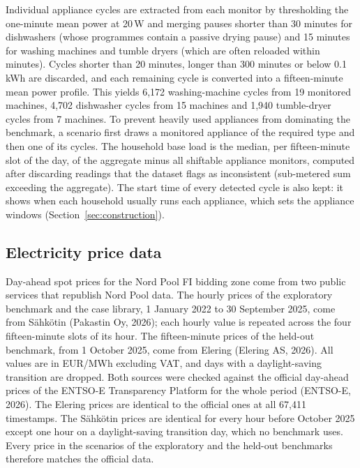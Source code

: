 \documentclass[12pt,a4paper]{report}
\begin{document}
Individual appliance cycles are extracted from each monitor by
thresholding the one-minute mean power at 20\,W and merging pauses
shorter than 30 minutes for dishwashers (whose programmes contain a
passive drying pause) and 15 minutes for washing machines and tumble
dryers (which are often reloaded within minutes). Cycles shorter than
20 minutes, longer than 300 minutes or below 0.1\,kWh are discarded, and
each remaining cycle is converted into a fifteen-minute mean power
profile. This yields 6,172 washing-machine cycles from 19 monitored
machines, 4,702 dishwasher cycles from 15 machines and 1,940
tumble-dryer cycles from 7 machines. To prevent heavily used appliances
from dominating the benchmark, a scenario first draws a monitored
appliance of the required type and then one of its cycles. The household
base load is the median, per fifteen-minute slot of the day, of the
aggregate minus all shiftable appliance monitors, computed after
discarding readings that the dataset flags as inconsistent (sub-metered
sum exceeding the aggregate). The start time of every detected cycle is
also kept: it shows when each household usually runs each appliance,
which sets the appliance windows (Section~\ref{sec:construction}).

\subsection{Electricity price data}

Day-ahead spot prices for the Nord Pool FI bidding zone come from two
public services that republish Nord Pool data. The hourly prices of the
exploratory benchmark and the case library, 1 January 2022 to 30
September 2025, come from Sähkötin (Pakastin Oy, 2026); each hourly value
is repeated across the four fifteen-minute slots of its hour. The
fifteen-minute prices of the held-out benchmark, from 1 October 2025,
come from Elering (Elering AS, 2026). All values are in EUR/MWh excluding
VAT, and days with a daylight-saving transition are dropped. Both
sources were checked against the official day-ahead prices of the
ENTSO-E Transparency Platform for the whole period (ENTSO-E, 2026). The
Elering prices are identical to the official ones at all 67,411
timestamps. The Sähkötin prices are identical for every hour before
October 2025 except one hour on a daylight-saving transition day, which
no benchmark uses. Every price in the scenarios of the exploratory and
the held-out benchmarks therefore matches the official data.
\end{document}
